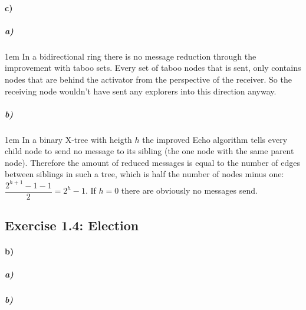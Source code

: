 \documentclass[12pt,a4paper]{article}
\begin{document}
\paragraph{c)}
\subparagraph{a)\\}
\begingroup
\leftskip1em
	In a bidirectional ring there is no message reduction through the improvement with taboo sets. Every set of taboo nodes that is sent, only contains nodes that are behind the activator from the perspective of the receiver. So the receiving node wouldn't have sent any explorers into this direction anyway.
\par
\endgroup
\subparagraph{b)\\}
\begingroup
\leftskip1em
In a binary X-tree with heigth $h$ the improved Echo algorithm tells every child node to send no message to its sibling (the one node with the same parent node). Therefore the amount of reduced messages is equal to the number of edges between siblings in such a tree, which is half the number of nodes minus one: $\dfrac{2^{h+1}-1-1}{2}=2^{h}-1$. If $h=0$ there are obviously no messages send.
\par
\endgroup
 

\subsection*{Exercise 1.4: Election}
\paragraph{b)} %
	\subparagraph{a)} %
	\subparagraph{b)} %
\end{document}
